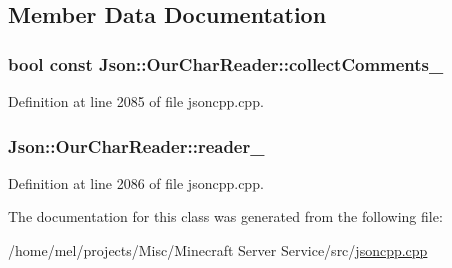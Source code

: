 \subsection{Member Data Documentation}
\subsubsection[{\texorpdfstring{collect\+Comments\+\_\+}{collectComments_}}]{\setlength{\rightskip}{0pt plus 5cm}bool const Json\+::\+Our\+Char\+Reader\+::collect\+Comments\+\_\+\hspace{0.3cm}{\ttfamily [private]}}\hypertarget{class_json_1_1_our_char_reader_aa6afd3d0f754cadad0f6d2be38bcfee0}{}\label{class_json_1_1_our_char_reader_aa6afd3d0f754cadad0f6d2be38bcfee0}


Definition at line 2085 of file jsoncpp.\+cpp.

\subsubsection[{\texorpdfstring{reader\+\_\+}{reader_}}]{ Json\+::\+Our\+Char\+Reader\+::reader\+\_\+\hspace{0.3cm}{\ttfamily [private]}}\hypertarget{class_json_1_1_our_char_reader_aedd4520b8570654ed7aa0726075ee58d}{}\label{class_json_1_1_our_char_reader_aedd4520b8570654ed7aa0726075ee58d}


Definition at line 2086 of file jsoncpp.\+cpp.



The documentation for this class was generated from the following file\+:\begin{DoxyCompactItemize}
\item 
/home/mel/projects/\+Misc/\+Minecraft Server Service/src/\hyperlink{jsoncpp_8cpp}{jsoncpp.\+cpp}\end{DoxyCompactItemize}
